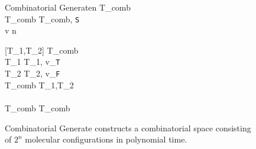 
\begin{figure}[htbp]
\begin{center}

	\begin{pseudocode}{Combinatorial Generate}{n}
		T_{comb} \GETS \emptyset \\
		T_{comb} \GETS {}T_{comb}, \texttt{S} \text{)} \\ 
	
		\FOR v   n \DO
			\BEGIN
			
			[T_1,T_2] \GETS {} T_{comb}\text{)}\\
			T_1 \GETS {}T_1, v_{\texttt{T}} \text{)}\\
			T_2 \GETS {}T_2, v_{\texttt{F}} \text{)}\\
			T_{comb} \GETS {}T_1,T_2\text{)}\\
		\END
		\\
		T_{comb} \GETS {}T_{comb}\text{)} \\
	\end{pseudocode}

\caption{{\sc Combinatorial Generate} constructs a combinatorial space consisting of $2^n$ molecular configurations in polynomial time.}
\label{combinatorialGenerate}
\end{center}
\end{figure}
